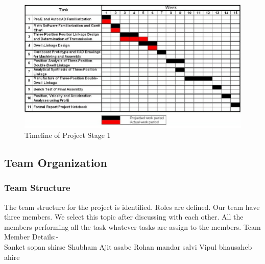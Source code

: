 \begin{figure}[!h]
\centering
\includegraphics[width = \textwidth]{./sem2plan}
\caption{Timeline of Project Stage 1}
\end{figure}
\newpage
\subsection{Team Organization}
\subsubsection{Team Structure}
The team structure for the project is identified. Roles are defined. Our team
have three members. We select this topic after discussing with each other. All the
members performing all the task whatever tasks are assign to the members.
Team Member Details:-\\
Sanket sopan  shirse 
Shubham  Ajit asabe  
Rohan mandar salvi  
Vipul bhausaheb ahire 

